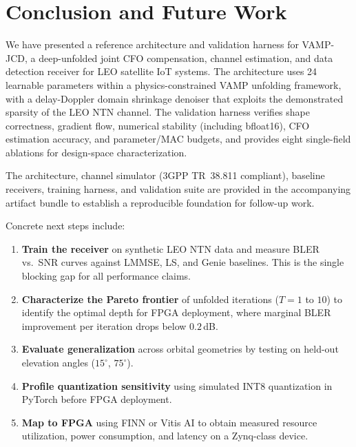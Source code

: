 \documentclass{article}
\begin{document}
\section{Conclusion and Future Work}
\label{sec:conclusion}

We have presented a reference architecture and validation harness for VAMP-JCD, a deep-unfolded joint CFO compensation, channel estimation, and data detection receiver for LEO satellite IoT systems. The architecture uses 24 learnable parameters within a physics-constrained VAMP unfolding framework, with a delay-Doppler domain shrinkage denoiser that exploits the demonstrated sparsity of the LEO NTN channel. The validation harness verifies shape correctness, gradient flow, numerical stability (including bfloat16), CFO estimation accuracy, and parameter/MAC budgets, and provides eight single-field ablations for design-space characterization.

The architecture, channel simulator (3GPP TR~38.811 compliant), baseline receivers, training harness, and validation suite are provided in the accompanying artifact bundle to establish a reproducible foundation for follow-up work.

Concrete next steps include:

\begin{enumerate}
  \item \textbf{Train the receiver} on synthetic LEO NTN data and measure BLER vs.\ SNR curves against LMMSE, LS, and Genie baselines. This is the single blocking gap for all performance claims.
  \item \textbf{Characterize the Pareto frontier} of unfolded iterations ($T = 1$ to $10$) to identify the optimal depth for FPGA deployment, where marginal BLER improvement per iteration drops below $0.2$\,dB.
  \item \textbf{Evaluate generalization} across orbital geometries by testing on held-out elevation angles ($15^\circ$, $75^\circ$).
  \item \textbf{Profile quantization sensitivity} using simulated INT8 quantization in PyTorch before FPGA deployment.
  \item \textbf{Map to FPGA} using FINN or Vitis AI to obtain measured resource utilization, power consumption, and latency on a Zynq-class device.
\end{enumerate}

\end{document}
